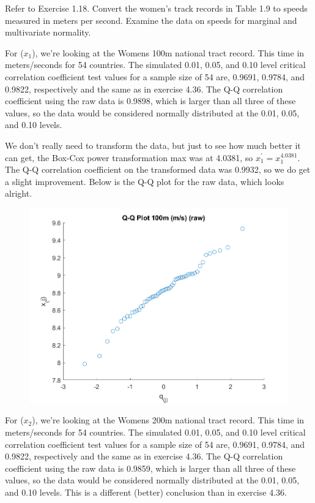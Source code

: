 Refer to Exercise 1.18. Convert the women's track records in Table 1.9 to speeds measured
in meters per second. Examine the data on speeds for marginal and multivariate
normality.

For ($x_{1}$), we're looking at the Womens 100m national tract record. This time in meters/seconds for 54 countries. The simulated 0.01, 0.05, and 0.10 level critical correlation coefficient test values for a sample size of 54 are, 0.9691, 0.9784, and 0.9822, respectively and the same as in exercise 4.36. The Q-Q correlation coefficient using the raw data is 0.9898, which is larger than all three of these values, so the data would be considered normally distributed at the 0.01, 0.05, and 0.10 levels.

We don't really need to transform the data, but just to see how much better it can get, the Box-Cox power transformation max was at 4.0381, so $x_{1}^{\prime} = x_{1}^{4.0381}$. The Q-Q correlation coefficient on the transformed data was 0.9932, so we do get a slight improvement. Below is the Q-Q plot for the raw data, which looks alright.

\begin{center}
    \begin{figure}[H]
        \centering
        \includegraphics[scale=0.6]{./matlab/chapter-4/sol4.37.qq.1.png}
    \end{figure}
\end{center}

For ($x_{2}$), we're looking at the Womens 200m national tract record. This time in meters/seconds for 54 countries. The simulated 0.01, 0.05, and 0.10 level critical correlation coefficient test values for a sample size of 54 are, 0.9691, 0.9784, and 0.9822, respectively and the same as in exercise 4.36. The Q-Q correlation coefficient using the raw data is 0.9859, which is larger than all three of these values, so the data would be considered normally distributed at the 0.01, 0.05, and 0.10 levels. This is a different (better) conclusion than in exercise 4.36.

